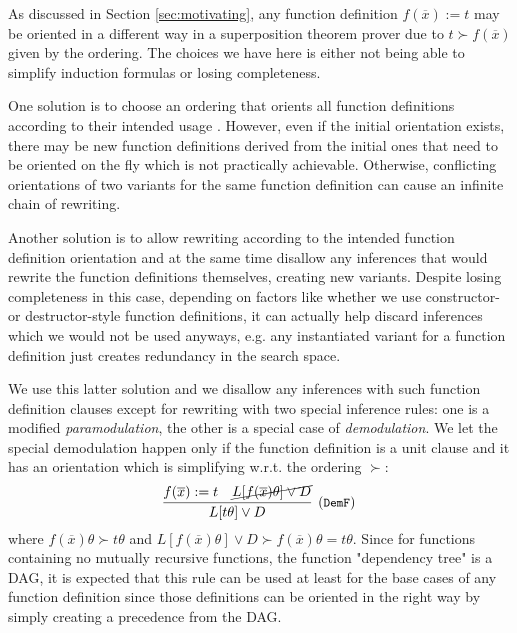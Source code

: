 
As discussed in Section \ref{sec:motivating}, any function definition $f(\overline{x}):= t$ may be oriented in a different way in a superposition theorem prover due to $t\succ f(\overline{x})$ given by the ordering. The choices we have here is either not being able to simplify induction formulas or losing completeness.

One solution is to choose an ordering that orients all function definitions according to their intended usage \cite{terminating,kbodecidability,kbopolynomial}. However, even if the initial orientation exists, there may be new function definitions derived from the initial ones that need to be oriented on the fly which is not practically achievable. Otherwise, conflicting orientations of two variants for the same function definition can cause an infinite chain of rewriting.

Another solution is to allow rewriting according to the intended function definition orientation and at the same time disallow any inferences that would rewrite the function definitions themselves, creating new variants. Despite losing completeness in this case, depending on factors like whether we use constructor- or destructor-style function definitions, it can actually help discard inferences which we would not be used anyways, e.g. any instantiated variant for a function definition just creates redundancy in the search space.

We use this latter solution and we disallow any inferences with such function definition clauses except for rewriting with two special inference rules: one is a modified \textit{paramodulation}, the other is a special case of \textit{demodulation}. We let the special demodulation happen only if the function definition is a unit clause and it has an orientation which is simplifying w.r.t. the ordering $\succ$:
\begin{equation}
	\infer[\small{(\texttt{DemF})}]{L[t\theta]\lor D}
	{f(\overline{x}):=t & \cancel{L[f(\overline{x})\theta]\lor D}}
\end{equation}
where $f(\overline{x})\theta\succ t\theta$ and $L[f(\overline{x})\theta]\lor D\succ f(\overline{x})\theta=t\theta$. Since for functions containing no mutually recursive functions, the function "dependency tree" is a DAG, it is expected that this rule can be used at least for the base cases of any function definition since those definitions can be oriented in the right way by simply creating a precedence from the DAG.

